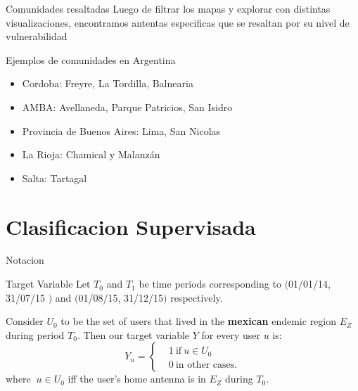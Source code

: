 \documentclass{beamer}
\begin{document}
\begin{frame}{Comunidades resaltadas}
	Luego de filtrar los mapas y explorar con distintas visualizaciones, encontramos antentas especificas que se resaltan por su nivel de vulnerabilidad

	\bigskip

	\begin{block}{Ejemplos de comunidades en Argentina}
		\begin{itemize}
			\item Cordoba: Freyre, La Tordilla, Balnearia
			\item AMBA: Avellaneda, Parque Patricios, San Isidro
			\item Provincia de Buenos Aires: Lima, San Nicolas
			\item La Rioja: Chamical y Malanz\'an
			\item Salta: Tartagal
		\end{itemize}

	\end{block}
\end{frame}


\section{Clasificacion Supervisada}

\begin{frame}{Notacion}
			\begin{block}{Target Variable}
			Let $T_0$ and $T_1$ be time periods corresponding to $($01/01/14, 31/07/15 $)$ and $($01/08/15, 31/12/15$)$ respectively.

			Consider $U_0$ to be the set of users that lived in the \textbf{mexican} endemic region $E_Z$ during period $T_0$. Then our target variable $Y$ for every user $u$ is:
			\[
			Y_u =
			\begin{cases}
			&1 \ \mbox{if} \ u \in U_0  \\
			&0 \ \mbox{in other cases}.
			\end{cases}
			\]
			where $\ u \in U_0$ iff the user's home antenna is in $E_Z$ during $T_0$.
			\end{block}

\end{frame}
\end{document}
